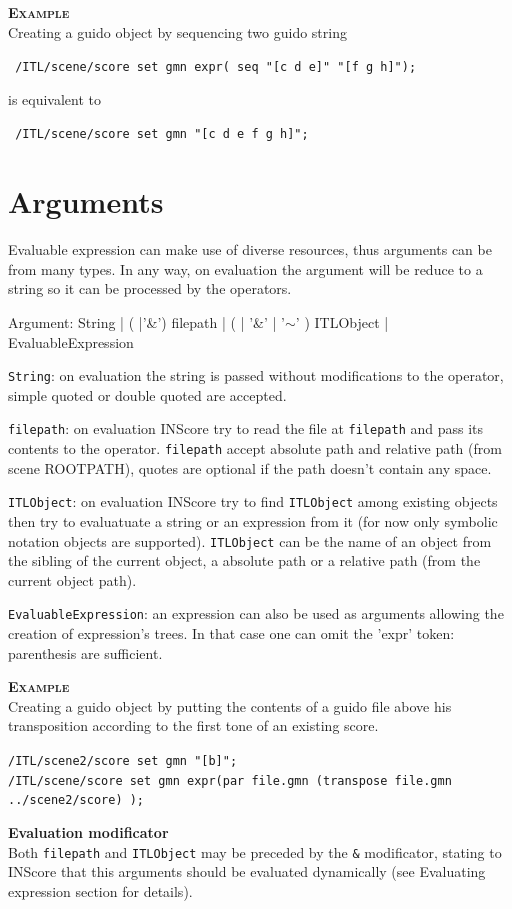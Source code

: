 \documentclass[a4paper,twoside]{report}
\newcommand{\sublevel}[1]	{\section{#1}}
\newcommand{\OSC}[1]		{\texttt{#1}}
\newcommand{\example}		{\textbf{\hspace{-1.5cm}\textbf{\textsc{Example }}}}
\let\olditemize\itemize
\let\oldenditemize\enditemize
\renewenvironment{itemize} 	{\olditemize \setlength{\itemsep}{1mm}}{\oldenditemize}
\newcommand{\sample}	[1]			{\vspace{-2mm}\begin{center}\colorbox{mygrey}{
								\begin{minipage}[t]{0.9\columnwidth} 
								{\small \texttt{#1}}
								\end{minipage}}\end{center}}
\begin{document}
\example \\
Creating a guido object by sequencing two guido string
\sample{
/ITL/scene/score set gmn expr( seq "[c d e]" "[f g h]");
}
is equivalent to
\sample{
/ITL/scene/score set gmn "[c d e f g h]";
}


\pagebreak
\sublevel{Arguments}
Evaluable expression can make use of diverse resources, thus arguments can be from many types. In any way, on evaluation the argument will be reduce to a string so it can be processed by the operators.
\begin{rail}
Argument: 		String
			| 	( |'\&') filepath
			| 	( | '\&' | '$\sim$' ) ITLObject
			| 	EvaluableExpression
\end{rail}


\begin{itemize}
\item \OSC{String}: on evaluation the string is passed without modifications to the operator, simple quoted or double quoted are accepted.
\item \OSC{filepath}: on evaluation INScore try to read the file at \OSC{filepath} and pass its contents to the operator. 
						\OSC{filepath} accept absolute path and relative path (from scene ROOTPATH),
						 quotes are optional if the path doesn't contain any space.
\item \OSC{ITLObject}: on evaluation INScore try to find \OSC{ITLObject} among existing objects then try to evaluatuate a string or an expression from it (for now only symbolic notation objects are supported). \OSC{ITLObject} can be the name of an object from the sibling of the current object, a absolute path or a relative path (from the current object path).
\item \OSC{EvaluableExpression}: an expression can also be used as arguments allowing the creation of expression's trees. In that case one can omit the 'expr' token: parenthesis are sufficient.
\end{itemize}

\example\\
Creating a guido object by putting the contents of a guido file above his transposition according to the first tone of an existing score.
\sample{/ITL/scene2/score set gmn "[b]"; \\
/ITL/scene/score set gmn expr(par file.gmn (transpose file.gmn ../scene2/score) );
}
\smallbreak
\textbf{Evaluation modificator}\\
Both \OSC{filepath} and \OSC{ITLObject} may be preceded by the \OSC{\&} modificator, stating to INScore that this arguments should be evaluated dynamically (see Evaluating expression section for details).
\end{document}
